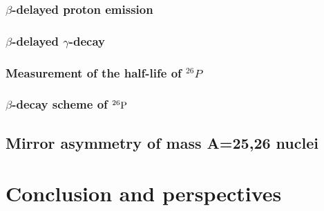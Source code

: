 \documentclass[UTF8]{ctexart}
\begin{document}
\subsubsection{$\beta$-delayed proton emission}
\subsubsection{$\beta$-delayed $\gamma$-decay}
\subsubsection{Measurement of the half-life of $^{26}P$}
\subsubsection{$\beta$-decay scheme of $^{26}\textnormal{P}$}
\subsection{Mirror asymmetry of mass A=25,26 nuclei}
\section{Conclusion and perspectives}
\end{document}
